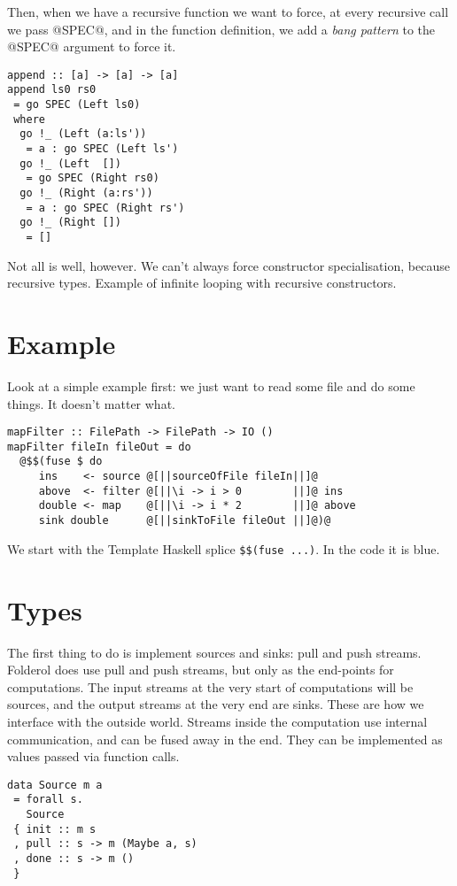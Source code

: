 Then, when we have a recursive function we want to force, at every recursive call we pass @SPEC@, and in the function definition, we add a \emph{bang pattern} to the @SPEC@ argument to force it.
\begin{lstlisting}
append :: [a] -> [a] -> [a]
append ls0 rs0
 = go SPEC (Left ls0)
 where
  go !_ (Left (a:ls'))
   = a : go SPEC (Left ls')
  go !_ (Left  [])
   = go SPEC (Right rs0)
  go !_ (Right (a:rs'))
   = a : go SPEC (Right rs')
  go !_ (Right [])
   = []
\end{lstlisting}

Not all is well, however.
We can't always force constructor specialisation, because recursive types.
Example of infinite looping with recursive constructors.


\section{Example}

Look at a simple example first: we just want to read some file and do some things.
It doesn't matter what.
\begin{lstlisting}
mapFilter :: FilePath -> FilePath -> IO ()
mapFilter fileIn fileOut = do
  @$$(fuse $ do
     ins    <- source @[||sourceOfFile fileIn||]@
     above  <- filter @[||\i -> i > 0        ||]@ ins
     double <- map    @[||\i -> i * 2        ||]@ above
     sink double      @[||sinkToFile fileOut ||]@)@
\end{lstlisting}

We start with the Template Haskell splice \verb/$$(fuse ...)/. In the code it is blue. 

\section{Types}
The first thing to do is implement sources and sinks: pull and push streams.
Folderol does use pull and push streams, but only as the end-points for computations.
The input streams at the very start of computations will be sources, and the output streams at the very end are sinks.
These are how we interface with the outside world.
Streams inside the computation use internal communication, and can be fused away in the end. They can be implemented as values passed via function calls.

\begin{lstlisting}
data Source m a
 = forall s.
   Source
 { init :: m s
 , pull :: s -> m (Maybe a, s)
 , done :: s -> m ()
 }
\end{lstlisting}


